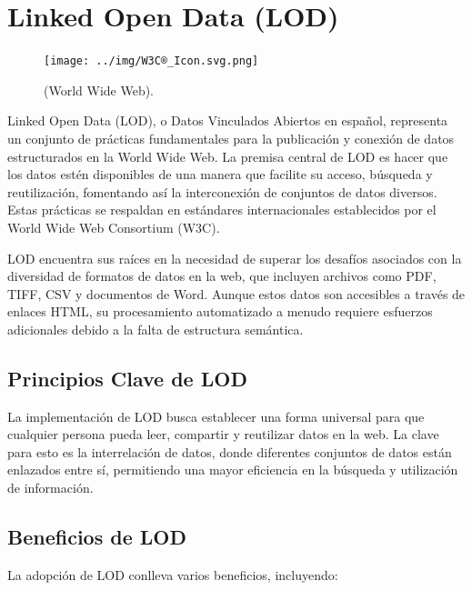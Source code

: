 \documentclass[11pt]{report}
\begin{document}
\chapter{Linked Open Data (LOD)}
		\begin{figure}
			\centering
			\texttt{[image: ../img/W3C®\_Icon.svg.png]}
			\caption{(World Wide Web).}
			\label{fig:od->W3C}
		\end{figure}
		Linked Open Data (LOD), o Datos Vinculados Abiertos en español, representa un conjunto de prácticas fundamentales para la publicación y conexión de datos estructurados en la World Wide Web. La premisa central de LOD es hacer que los datos estén disponibles de una manera que facilite su acceso, búsqueda y reutilización, fomentando así la interconexión de conjuntos de datos diversos. Estas prácticas se respaldan en estándares internacionales establecidos por el World Wide Web Consortium (W3C).
		
		LOD encuentra sus raíces en la necesidad de superar los desafíos asociados con la diversidad de formatos de datos en la web, que incluyen archivos como PDF, TIFF, CSV y documentos de Word. Aunque estos datos son accesibles a través de enlaces HTML, su procesamiento automatizado a menudo requiere esfuerzos adicionales debido a la falta de estructura semántica.

		\section{Principios Clave de LOD}

		La implementación de LOD busca establecer una forma universal para que cualquier persona pueda leer, compartir y reutilizar datos en la web. La clave para esto es la interrelación de datos, donde diferentes conjuntos de datos están enlazados entre sí, permitiendo una mayor eficiencia en la búsqueda y utilización de información.

		\section{Beneficios de LOD}

		La adopción de LOD conlleva varios beneficios, incluyendo:
\end{document}
